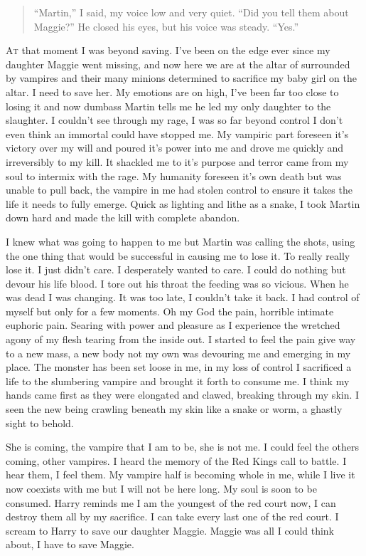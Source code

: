 
\begin{quote}
	``Martin,” I said, my voice low and very quiet. “Did you tell them about Maggie?”
	He closed his eyes, but his voice was steady. “Yes.”
\end{quote}

\lettrine[lines=2,lraise=0]{A}t that moment I was beyond saving. I've been on the edge ever since my daughter Maggie went missing, and now here we are at the altar of \chichenitza* surrounded by vampires and their many minions determined to sacrifice my baby girl on the altar. I need to save her. 
My emotions are on high, I've been far too close to losing it and now dumbass Martin tells me he led my only daughter to the slaughter. I couldn't see through my rage, I was so far beyond control I don't even think an immortal could have stopped me. My vampiric part foreseen it's victory over my will and poured it's power into me and drove me quickly and irreversibly to my kill. It shackled me to it's purpose and terror came from my soul to intermix with the rage. My humanity foreseen it's own death but was unable to pull back, the vampire in me had stolen control to ensure it takes the life it needs to fully emerge. Quick as lighting and lithe as a snake, I took Martin down hard and made the kill with complete abandon.

I knew what was going to happen to me but Martin was calling the shots, using the one thing that would be successful in causing me to lose it. To really really lose it. I just didn't care. I desperately wanted to care. I could do nothing but devour his life blood. I tore out his throat the feeding was so vicious. When he was dead I was changing. It was too late, I couldn't take it back. I had control of myself but only for a few moments. Oh my God the pain, horrible intimate euphoric pain. Searing with power and pleasure as I experience the wretched agony of my flesh tearing from the inside out. I started to feel the pain give way to a new mass, a new body not my own was devouring me and emerging in my place. The monster has been set loose in me, in my loss of control I sacrificed a life to the slumbering vampire and brought it forth to consume me. I think my hands came first as they were elongated and clawed, breaking through my skin. I seen the new being crawling beneath my skin like a snake or worm, a ghastly sight to behold.

She is coming, the vampire that I am to be, she is not me. I could feel the others coming, other vampires. I heard the memory of the Red Kings call to battle. I hear them, I feel them. My vampire half is becoming whole in me, while I live it now coexists with me but I will not be here long. My soul is soon to be consumed. Harry reminds me I am the youngest of the red court now, I can destroy them all by my sacrifice. I can take every last one of the red court. I scream to Harry to save our daughter Maggie. Maggie was all I could think about, I have to save Maggie.


